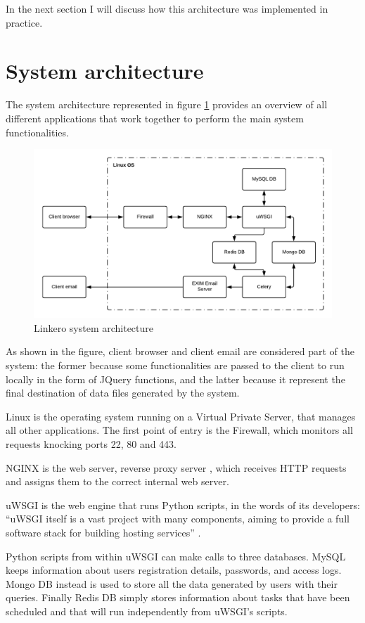 In the next section I will discuss how this architecture was implemented in
practice.

\section{System architecture}
The system architecture represented in figure \ref{fig:sysarch} provides an
overview of all different applications that work together to perform the main
system functionalities.

\begin{figure}[h!]
\centering
\includegraphics[scale=0.7]{imgs/SystemArchitecture.pdf}
\caption{Linkero system architecture}
\label{fig:sysarch}
\end{figure}

As shown in the figure, client browser and client email are considered part of
the system: the former because some functionalities are passed to the client to
run locally in the form of JQuery functions, and the latter because it represent
the final destination of data files generated by the system.

Linux is the operating system running on a Virtual Private Server, that manages
all other applications. The first point of entry is the Firewall, which monitors
all requests knocking ports 22, 80 and 443.

NGINX is the web server, reverse proxy server \cite{WikiNginx}, which receives
HTTP requests and assigns them to the correct internal web server.

uWSGI is the web engine that runs Python scripts, in the words of its
developers: ``uWSGI itself is a vast project with many components, aiming to
provide a full software stack for building hosting services'' \cite{RtduWsgi}.

Python scripts from within uWSGI can make calls to three databases. MySQL keeps
information about users registration details, passwords, and access logs. Mongo
DB instead is used to store all the data generated by users with their queries.
Finally Redis DB simply stores information about tasks that have been scheduled
and that will run independently from uWSGI's scripts.

